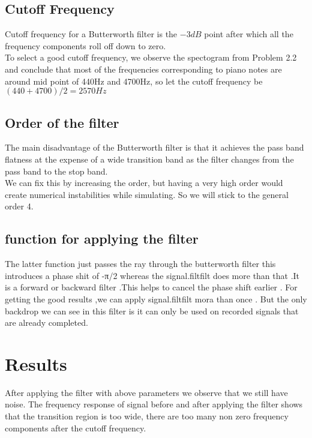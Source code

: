 \documentclass[journal,12pt,twocolumn]{IEEEtran}
\begin{document}
  \subsection{\textbf{Cutoff Frequency}}
  Cutoff frequency for a Butterworth filter is the $-3dB$ point after which all the frequency components roll off down to zero.\\
  To select a good cutoff frequency, we observe the spectogram from Problem 2.2 and conclude that most of the frequencies corresponding to piano notes are around mid point of 440Hz and 4700Hz, so let the cutoff frequency be $(440+4700)/2 = 2570Hz$
  \subsection{\textbf{Order of the filter}}
  The main disadvantage of the Butterworth filter is that it achieves the pass band flatness at the expense of a wide transition band as the filter changes from the pass band to the stop band.\\
  We can fix this by increasing the order, but having a very high order would create numerical instabilities while simulating. So we will stick to the general order 4.
  \subsection{\textbf{function for applying the filter}}
  The latter function just passes the ray through the butterworth filter this introduces a phase shit of -π/2 whereas the signal.filtfilt does more than that .It is a forward or backward filter .This helps to cancel the phase shift earlier . For getting the good results ,we can apply signal.filtfilt mora than once .
  But the only backdrop we can see in this filter is it can only be used on recorded signals that are already completed.
  
\section{\textbf{Results}}
    After applying the filter with above parameters we observe that we still have noise. The frequency response of signal before and after applying the filter shows that the transition region is too wide, there are too many non zero frequency components after the cutoff frequency.
\\
\\
\\
\\
\end{document}
